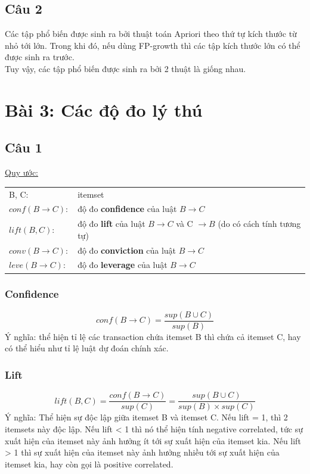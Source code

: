 \documentclass{article}
\begin{document}
\begin{flushleft}
\subsection{Câu 2}
Các tập phổ biến được sinh ra bởi thuật toán Apriori theo thứ tự kích thước từ nhỏ tới lớn. Trong khi đó, nếu dùng FP-growth thì các tập kích thước lớn có thể được sinh ra trước.\\
Tuy vậy, các tập phổ biến được sinh ra bởi 2 thuật là giống nhau.
\end{flushleft}



\section{Bài 3: Các độ đo lý thú}\label{sec: prob3}
\subsection{Câu 1}
\begin{flushleft}
	\underline{Quy ước:}
	\begin{tabular}{l l}
		B, C: &  itemset\\
		$conf\left(B \to C\right)$: &  độ đo \textbf{confidence} của luật $B \to C$ \\
		$lift\left(B, C\right):$ &  độ đo \textbf{lift} của luật $B \to C$ và C $\to B$ (do có cách tính tương tự)\\
		$conv\left(B \to C\right):$ &  độ đo \textbf{conviction} của luật $B \to C$ \\ 
		$leve\left(B \to C\right):$ &  độ đo \textbf{leverage} của luật $B \to C$ \\
	\end{tabular}
\end{flushleft}
\subsubsection{Confidence}
\begin{equation}
	conf\left(B \to C \right) = \frac{sup \left( B \cup C \right)}{sup \left( B\right)}
\end{equation}
Ý nghĩa: thể hiện tỉ lệ các transaction chứa itemset B thì chứa cả itemset C, hay có thể hiểu như tỉ lệ luật dự đoán chính xác.
\subsubsection{Lift}
\begin{equation}
	lift\left( B,C \right) = \frac{conf\left( B \to C \right)}{sup \left( C \right)} = \frac{sup \left(B \cup C \right)}{sup \left( B\right) \times sup \left( C \right)}
\end{equation}
Ý nghĩa: Thể hiện sự độc lập giữa itemset B và itemset C. Nếu lift = 1, thì 2 itemsets này độc lập. Nếu lift < 1 thì nó thể hiện tính negative correlated, tức sự xuất hiện của itemset này ảnh hưởng ít tới sự xuất hiện của itemset kia. Nếu lift > 1 thì sự xuất hiện của itemset này ảnh hưởng nhiều tới sự xuất hiện của itemset kia, hay còn gọi là positive correlated.
\end{document}
